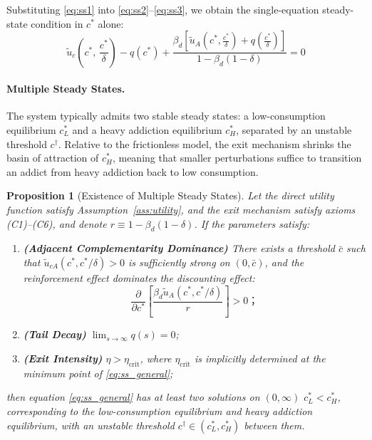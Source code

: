 \documentclass[12pt]{article}
\newtheorem{proposition}{Proposition}
\begin{document}
Substituting \eqref{eq:ss1} into \eqref{eq:ss2}--\eqref{eq:ss3},
we obtain the single-equation steady-state condition in $c^*$ alone:
\begin{equation}
    \tilde{u}_c\!\left(c^*,\, \frac{c^*}{\delta}\right)
    - q(c^*)
    + \frac{\beta_d\!\left[\tilde{u}_A\!\left(c^*, \frac{c^*}{\delta}\right)
    + q\!\left(\frac{c^*}{\delta}\right)\right]}{1 - \beta_d(1-\delta)} = 0
    \label{eq:ss_general}
\end{equation}

\paragraph{Multiple Steady States.} The system typically admits two stable steady states: a low-consumption equilibrium $c_L^*$ and a heavy addiction equilibrium
$c_H^*$, separated by an unstable threshold $c^\dagger$. Relative to the frictionless model, the exit mechanism shrinks
the basin of attraction of $c_H^*$, meaning that smaller perturbations suffice to transition an addict from heavy addiction back to low consumption.

\begin{proposition}[Existence of Multiple Steady States]\label{prop:multiss}
Let the direct utility function satisfy Assumption~\ref{ass:utility}, and the exit mechanism satisfy axioms (C1)--(C6),
and denote $r \equiv 1 - \beta_d(1-\delta)$. If the parameters satisfy:
\begin{enumerate}
        \item \textbf{(Adjacent Complementarity Dominance)} There exists a threshold $\bar{c}$ such that
    $\tilde{u}_{cA}(c^*, c^*/\delta) > 0$ is sufficiently strong on $(0, \bar{c})$,
    and the reinforcement effect dominates the discounting effect:
    \[
        \frac{\partial}{\partial c^*}
        \left[\frac{\beta_d \tilde{u}_A(c^*, c^*/\delta)}{r}\right] > 0；
    \]
        \item \textbf{(Tail Decay)} $\lim_{s\to\infty} q(s) = 0$;
    \item \textbf{(Exit Intensity)} $\eta > \eta_{\mathrm{crit}}$,
    where $\eta_{\mathrm{crit}}$ is implicitly determined at the minimum point of \eqref{eq:ss_general};
\end{enumerate}
 
then equation \eqref{eq:ss_general} has at least two solutions on $(0, \infty)$
$c^*_L < c^*_H$, corresponding to the low-consumption equilibrium and heavy addiction equilibrium,
with an unstable threshold $c^\dagger \in (c^*_L, c^*_H)$ between them.
\end{proposition}
\end{document}
